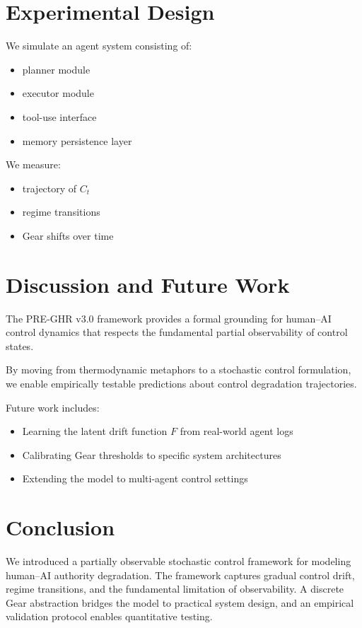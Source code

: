 \documentclass[11pt]{article}
\begin{document}
\section{Experimental Design}

We simulate an agent system consisting of:

\begin{itemize}
\item planner module
\item executor module
\item tool-use interface
\item memory persistence layer
\end{itemize}

We measure:

\begin{itemize}
\item trajectory of $C_t$
\item regime transitions
\item Gear shifts over time
\end{itemize}

\section{Discussion and Future Work}

The PRE-GHR v3.0 framework provides a formal grounding for human--AI control dynamics that respects the fundamental partial observability of control states.

By moving from thermodynamic metaphors to a stochastic control formulation, we enable empirically testable predictions about control degradation trajectories.

Future work includes:
\begin{itemize}
\item Learning the latent drift function $F$ from real-world agent logs
\item Calibrating Gear thresholds to specific system architectures
\item Extending the model to multi-agent control settings
\end{itemize}

\section{Conclusion}

We introduced a partially observable stochastic control framework for modeling human--AI authority degradation. The framework captures gradual control drift, regime transitions, and the fundamental limitation of observability. A discrete Gear abstraction bridges the model to practical system design, and an empirical validation protocol enables quantitative testing.
\end{document}

